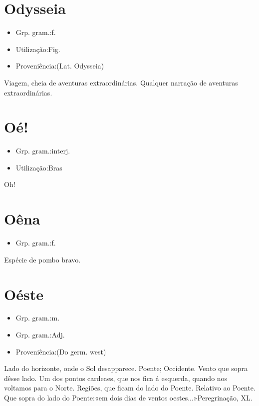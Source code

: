 \section{Odysseia}
\begin{itemize}
\item {Grp. gram.:f.}
\end{itemize}
\begin{itemize}
\item {Utilização:Fig.}
\end{itemize}
\begin{itemize}
\item {Proveniência:(Lat. \textunderscore Odysseia\textunderscore )}
\end{itemize}
Viagem, cheia de aventuras extraordinárias.
Qualquer narração de aventuras extraordinárias.
\section{Oé!}
\begin{itemize}
\item {Grp. gram.:interj.}
\end{itemize}
\begin{itemize}
\item {Utilização:Bras}
\end{itemize}
Oh!
\section{Oêna}
\begin{itemize}
\item {Grp. gram.:f.}
\end{itemize}
Espécie de pombo bravo.
\section{Oéste}
\begin{itemize}
\item {Grp. gram.:m.}
\end{itemize}
\begin{itemize}
\item {Grp. gram.:Adj.}
\end{itemize}
\begin{itemize}
\item {Proveniência:(Do germ. \textunderscore west\textunderscore )}
\end{itemize}
Lado do horizonte, onde o Sol desapparece.
Poente; Occidente.
Vento que sopra dêsse lado.
Um dos pontos cardeaes, que nos fica á esquerda, quando nos voltamos para o Norte.
Regiões, que ficam do lado do Poente.
Relativo ao Poente.
Que sopra do lado do Poente:«\textunderscore em dois dias de ventos oestes...\textunderscore »\textunderscore Peregrinação\textunderscore , XL.
